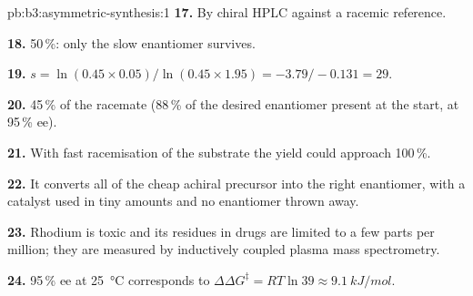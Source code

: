 \begin{solution}{pb:b3:asymmetric-synthesis:1}
\textbf{17.} By chiral HPLC against a racemic reference.

\textbf{18.} 50\,\%: only the slow enantiomer survives.

\textbf{19.} $s = \ln(0.45 \times 0.05)/\ln(0.45 \times 1.95) = -3.79/-0.131 = 29$.

\textbf{20.} 45\,\% of the racemate (88\,\% of the desired enantiomer present at the start,
at 95\,\% ee).

\textbf{21.} With fast racemisation of the substrate the yield could approach 100\,\%.

\textbf{22.} It converts all of the cheap achiral precursor into the right enantiomer,
with a catalyst used in tiny amounts and no enantiomer thrown away.

\textbf{23.} Rhodium is toxic and its residues in drugs are limited to a few parts per
million; they are measured by inductively coupled plasma mass spectrometry.

\textbf{24.} 95\,\% ee at \qty{25}{\celsius} corresponds to $\Delta\Delta G^\ddagger = RT\ln 39 \approx \qty{9.1}{kJ/mol}$.
\end{solution}

